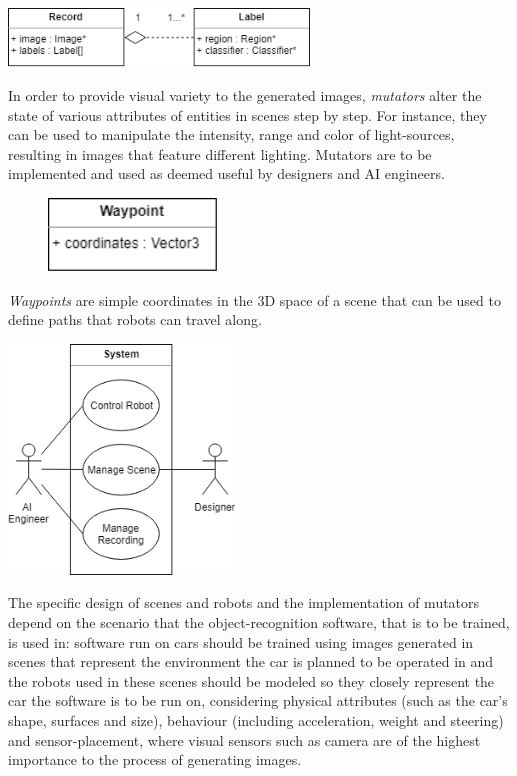 \begin{center}
\noindent\includegraphics[width=8cm]{tex/img/ch04/Classes_Record01.png}
\label{fig:classes-record}
\end{center}
In order to provide visual variety to the generated images, \textit{mutators} alter the state of various attributes of entities in scenes step by step. For instance, they can be used to manipulate the intensity, range and color of light-sources, resulting in images that feature different lighting. Mutators are to be implemented and used as deemed useful by designers and AI engineers.\\
\begin{figure}
\centering
\includegraphics[width=0.4\textwidth]{tex/img/ch04/Classes_Waypoint01.png}
\label{fig:classes-waypoint}
\end{figure}
\textit{Waypoints} are simple coordinates in the 3D space of a scene that can be used to define paths that robots can travel along.

\begin{center}
\noindent\includegraphics[width=6cm]{tex/img/ch04/UseCases_HighLevel_01.png}
\label{fig:use-cases-abstract}
\end{center}

The specific design of scenes and robots and the implementation of mutators depend on the scenario that the object-recognition software, that is to be trained, is used in: software run on cars should be trained using images generated in scenes that represent the environment the car is planned to be operated in and the robots used in these scenes should be modeled so they closely represent the car the software is to be run on, considering physical attributes (such as the car's shape, surfaces and size), behaviour (including acceleration, weight and steering)  and sensor-placement, where visual sensors such as camera are of the highest importance to the process of generating images.

